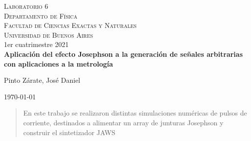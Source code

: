 \documentclass[twoside]{article}
\begin{document}
\begin{titlepage}
\begin{center}

\textsc{\LARGE Laboratorio 6}\\[0.5cm]
\textsc{\Large Departamento de Física}\\[0.5cm]
\textsc{\Large Facultad de Ciencias Exactas y Naturales}\\[0.5cm]
\textsc{\Large Universidad de Buenos Aires}\\[1.5cm]

1er cuatrimestre 2021\\[1.5cm]

{ \huge \bfseries Aplicación del efecto Josephson a la generación de señales arbitrarias con aplicaciones a la metrología}\\[1.5cm]


\begin{minipage}{0.8\textwidth}
\begin{flushleft} \large

Pinto Zárate, José Daniel\\

\end{flushleft}
\end{minipage}
\vfill
{\large \today}
\end{center}
\end{titlepage}


\begin{abstract}

En este trabajo se realizaron distintas simulaciones numéricas de pulsos de corriente, destinados a alimentar un array de junturas Josephson y construir el sintetizador JAWS

\end{abstract}
\end{document}
